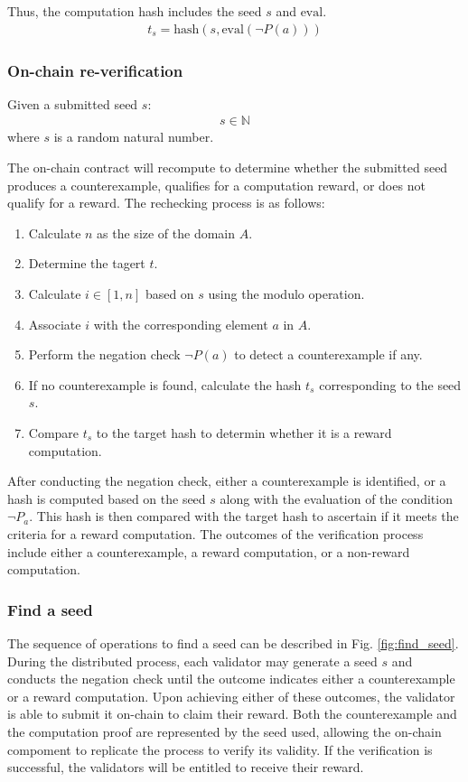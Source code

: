 \documentclass[runningheads]{llncs}
\begin{document}
Thus, the computation hash includes the seed  \( s \) and \(\text{eval}\). 
\begin{align}
t_s = \text{hash}(s, \text{eval}(\neg P(a)))
\end{align}
\subsubsection{On-chain re-verification}
Given a submitted seed $s$: 
\begin{align}
s \in \mathbb{N} 
\end{align}
where $s$ is a random natural number.

The on-chain contract will recompute to determine whether the submitted seed produces a counterexample, qualifies for a computation reward, or does not qualify for a reward. The rechecking process is as follows:
\begin{enumerate}
\item Calculate $n$ as the size of the domain $A$.
\item Determine the tagert $t$.
\item Calculate $i \in [1, n]$ based on $s$ using the modulo operation.
\item Associate \( i \) with the corresponding element $a$ in $A$.
\item Perform the negation check $\neg P(a)$ to detect a counterexample if any.
\item If no counterexample is found, calculate the hash \( t_s \) corresponding to the seed \( s \).
\item Compare \( t_s \) to the target hash to determin whether it is a reward computation.
\end{enumerate}

After conducting the negation check, either a counterexample is identified, or a hash is computed based on the seed $s$ along with the evaluation of the condition $\neg P_{a}$. This hash is then compared with the target hash to ascertain if it meets the criteria for a reward computation. The outcomes of the verification process include either a counterexample, a reward computation, or a non-reward computation.
\subsubsection{Find a seed}
The sequence of operations to find a seed can be described in Fig. \ref{fig:find_seed}. During the distributed process, each validator may generate a seed $s$ and conducts the negation check until the outcome indicates either a counterexample or a reward computation. Upon achieving either of these outcomes, the validator is able to submit it on-chain to claim their reward. Both the counterexample and the computation proof are represented by the seed used, allowing the on-chain compoment to replicate the process to verify its validity. If the verification is successful, the validators will be entitled to receive their reward.
\end{document}
